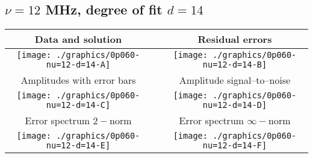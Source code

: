 

% 

\clearpage{}
\break{}

\subsection{$\nu = 12$ MHz, degree of fit $d = 14$}

\begin{table}[h]
    \begin{center}
        \begin{tabular}{ccc}
            Data and solution & \quad & Residual errors \\\hline
            \texttt{[image: ./graphics/0p060-nu=12-d=14-A]} &&
            \texttt{[image: ./graphics/0p060-nu=12-d=14-B]} \\[15pt]
            Amplitudes with error bars && Amplitude signal--to--noise \\\hline
            \texttt{[image: ./graphics/0p060-nu=12-d=14-C]} &&
            \texttt{[image: ./graphics/0p060-nu=12-d=14-D]} \\[15pt]
            Error spectrum $2-$norm && Error spectrum $\infty-$norm \\\hline
            \texttt{[image: ./graphics/0p060-nu=12-d=14-E]} &&
            \texttt{[image: ./graphics/0p060-nu=12-d=14-F]} \\[15pt]
        \end{tabular}
    \end{center}
\label{fig:elev=60, nu=12}
\end{table}



\endinput
